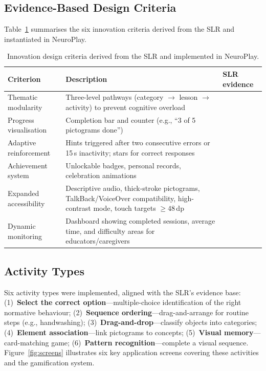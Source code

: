 \documentclass[preprint,12pt]{elsarticle}
\begin{document}
        \subsection{Evidence-Based Design Criteria}
            \label{subsec:criteria}
            Table~\ref{tab:criteria} summarises the six innovation criteria derived from the SLR and instantiated in NeuroPlay.
            \begin{table}[t]
            \centering
            \caption{Innovation design criteria derived from the SLR and implemented in NeuroPlay.}
            \label{tab:criteria}
            \begin{tabular}{@{}p{3cm}p{5.5cm}p{3.3cm}@{}}
            \toprule
            \textbf{Criterion} & \textbf{Description} & \textbf{SLR evidence} \\
            \midrule
            Thematic modularity & Three-level pathways (category $\to$ lesson $\to$ activity) to prevent cognitive overload & \cite{Ntalindwa2021,Bhavnani2019} \\[4pt]
            Progress visualisation & Completion bar and counter (e.g., ``3 of 5 pictograms done'') & \cite{Johnson2022,Cremaschi2025} \\[4pt]
            Adaptive reinforcement & Hints triggered after two consecutive errors or 15\,s inactivity; stars for correct responses & \cite{Harrison2020,Bhavnani2019} \\[4pt]
            Achievement system & Unlockable badges, personal records, celebration animations & \cite{Alqithami2021,Ong2019} \\[4pt]
            Expanded accessibility & Descriptive audio, thick-stroke pictograms, TalkBack/VoiceOver compatibility, high-contrast mode, touch targets $\geq 48$\,dp & \cite{Toma2024,Copetti2022} \\[4pt]
            Dynamic monitoring & Dashboard showing completed sessions, average time, and difficulty areas for educators/caregivers & \cite{Yip2023,Wong2020} \\
            \bottomrule
            \end{tabular}
            \end{table}
        \subsection{Activity Types}
            Six activity types were implemented, aligned with the SLR's evidence base: (1)~\textbf{Select the correct option}---multiple-choice identification of the right normative behaviour; (2)~\textbf{Sequence ordering}---drag-and-arrange for routine steps (e.g., handwashing); (3)~\textbf{Drag-and-drop}---classify objects into categories; (4)~\textbf{Element association}---link pictograms to concepts; (5)~\textbf{Visual memory}---card-matching game; (6)~\textbf{Pattern recognition}---complete a visual sequence. Figure~\ref{fig:screens} illustrates six key application screens covering these activities and the gamification system.
        
\end{document}
